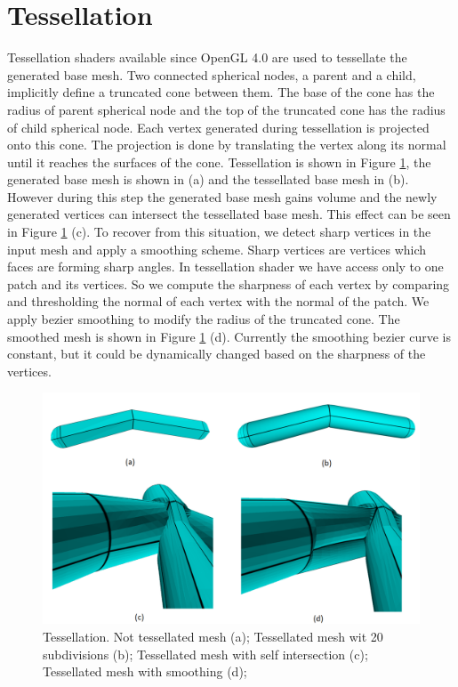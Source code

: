 \section{Tessellation}
Tessellation shaders available since OpenGL 4.0 are used to tessellate the generated base mesh.
Two connected spherical nodes, a parent and a child, implicitly define a truncated cone between them.
The base of the cone has the radius of parent spherical node and the top of the truncated cone has the radius of child spherical node.
Each vertex generated during tessellation is projected onto this cone.
The projection is done by translating the vertex along its normal until it reaches the surfaces of the cone.
Tessellation is shown in Figure \ref{fig:tessellation_ilu}, the generated base mesh is shown in (a) and the tessellated base mesh in (b).
However during this step the generated base mesh gains volume and the newly generated vertices can intersect the tessellated base mesh.
This effect can be seen in Figure \ref{fig:tessellation_ilu} (c).
To recover from this situation, we detect sharp vertices in the input mesh and apply a smoothing scheme.
Sharp vertices are vertices which faces are forming sharp angles.
In tessellation shader we have access only to one patch and its vertices.
So we compute the sharpness of each vertex by comparing and thresholding the normal of each vertex with the normal of the patch.
We apply bezier smoothing to modify the radius of the truncated cone.
The smoothed mesh is shown in Figure \ref{fig:tessellation_ilu} (d).
Currently the smoothing bezier curve is constant, but it could be dynamically changed based on the sharpness of the vertices.

\begin{figure}[ht]
    \centering
    \includegraphics[width=\linewidth]{images/tess_ilu}
    \caption[Tessellation and smoothing]{Tessellation. Not tessellated mesh (a); Tessellated mesh wit 20 subdivisions (b); Tessellated mesh with self intersection (c); Tessellated mesh with smoothing (d);}
    \label{fig:tessellation_ilu}
\end{figure}

